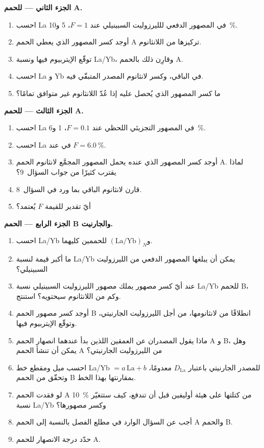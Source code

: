 \begin{problem}
\medskip\noindent\textbf{الجزء الثاني ---  للحمم A.}
\begin{enumerate}[resume]
\item احسب La في المصهور الدفعي للليرزوليت السبينيلي عند $F = 1$، 5
و\qty{10}{\percent}.
\item أوجد كسر المصهور الذي يعطي الحمم A تركيزها من اللانثانوم.
\item توقّع الإيتربيوم فيها ونسبة La/Yb، وقارِن ذلك بالحمم A.
\item احسب La و Yb في الباقي، وكسر لانثانوم المصدر
المتبقّي فيه.
\item ما كسر المصهور الذي يُحصل عليه إذا عُدّ اللانثانوم
غير متوافق تمامًا؟
\end{enumerate}

\medskip\noindent\textbf{الجزء الثالث ---  للحمم A.}
\begin{enumerate}[resume]
\item احسب La في المصهور التجزيئي اللحظي عند $F = 0.1$، 1
و\qty{6}{\percent}.
\item احسب La في  عند $F = \qty{6.0}{\percent}$.
\item أوجد كسر المصهور الذي عنده يحمل المصهور المجمَّع لانثانوم الحمم A.
لماذا يقترب كثيرًا من جواب السؤال~9؟
\item قارن لانثانوم الباقي بما ورد في السؤال~8.
\item أيّ تقدير للقيمة $F$ يُعتمد؟
\end{enumerate}

\medskip\noindent\textbf{الجزء الرابع --- الحمم B والجارنيت.}
\begin{enumerate}[resume]
\item احسب La/Yb و$(\mathrm{La}/\mathrm{Yb})_N$ للحممين كليهما.
\item ما أكبر قيمة لنسبة La/Yb يمكن أن يبلغها المصهور الدفعي
من الليرزوليت السبينيلي؟
\item عند أيّ كسر مصهور يملك مصهور الليرزوليت السبينيلي نسبة La/Yb للحمم
B، وكم من اللانثانوم سيحتويه؟ استنتج.
\item أوجد كسر مصهور الحمم B انطلاقًا من لانثانومها، من أجل الليرزوليت الجارنيتي،
وتوقّع الإيتربيوم فيها.
\item ماذا يقول المصدران عن العمقين اللذين بدأ عندهما انصهار الحمم A و B،
وهل يمكن أن تنشأ الحمم A من الليرزوليت الجارنيتي؟
\item احسب ميل ومقطع خط  La/Yb $= a\,
\mathrm{La} + b$ للمصدر الجارنيتي باعتبار $D_{\mathrm{La}}$ معدومًا،
وتحقّق من الحمم B بمقارنتها بهذا الخط.
\item لو فقدت الحمم A \qty{10}{\percent} من كتلتها على هيئة أوليفين قبل
أن تندفع، كيف ستتغيّر نسبة La/Yb وكسر مصهورها؟
\item أجب عن السؤال الوارد في مطلع الفصل بالنسبة إلى الحمم A والحمم B.
\item حدّد درجة الانصهار للحمم A.
\end{enumerate}
\end{problem}
